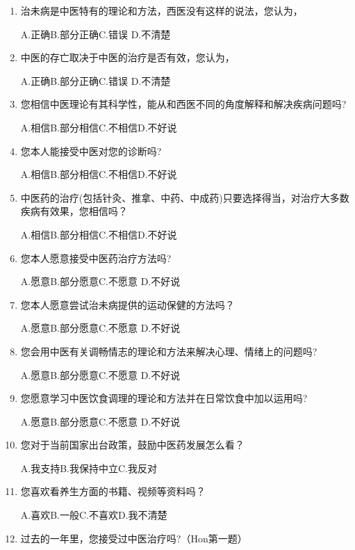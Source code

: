 \begin{enumerate}
\item 
治未病是中医特有的理论和方法，西医没有这样的说法，您认为，

A.正确\qquad B.部分正确\qquad C.错误 \qquad D.不清楚

\item 中医的存亡取决于中医的治疗是否有效，您认为，

A.正确\qquad B.部分正确\qquad C.错误 \qquad D.不清楚

\item 
您相信中医理论有其科学性，能从和西医不同的角度解释和解决疾病问题吗?

A.相信\qquad B.部分相信\qquad C.不相信\qquad D.不好说

\item 您本人能接受中医对您的诊断吗?

A.相信\qquad B.部分相信\qquad C.不相信\qquad D.不好说

\item 中医药的治疗(包括针灸、推拿、中药、中成药)只要选择得当，对治疗大多数疾病有效果，您相信吗？

A.相信\qquad B.部分相信\qquad C.不相信\qquad D.不好说

\item 您本人愿意接受中医药治疗方法吗?

A.愿意\qquad B.部分愿意\qquad C.不愿意 \qquad D.不好说

\item 您本人愿意尝试治未病提供的运动保健的方法吗？

A.愿意\qquad B.部分愿意\qquad C.不愿意 \qquad D.不好说

\item 您会用中医有关调畅情志的理论和方法来解决心理、情绪上的问题吗?

A.愿意\qquad B.部分愿意\qquad C.不愿意 \qquad D.不好说

\item 您愿意学习中医饮食调理的理论和方法并在日常饮食中加以运用吗?

A.愿意\qquad B.部分愿意\qquad C.不愿意 \qquad D.不好说

\item 
您对于当前国家出台政策，鼓励中医药发展怎么看？

A.我支持\qquad B.我保持中立\qquad C.我反对

\item 您喜欢看养生方面的书籍、视频等资料吗？

A.喜欢\qquad B.一般\qquad C.不喜欢\qquad D.我不清楚

\item 过去的一年里，您接受过中医治疗吗?（Hon第一题）


\end{enumerate}
